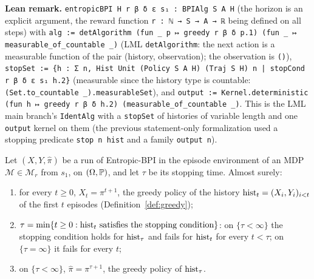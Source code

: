 \textbf{Lean remark.} \texttt{entropicBPI H r β δ ε s₁ : BPIAlg S A H} (the horizon is an
explicit argument, the reward function \texttt{r : ℕ → S → A → ℝ} being defined on all steps) with
\texttt{alg := detAlgorithm (fun \_ p ↦ greedy r β δ p.1) (fun \_ ↦ measurable\_of\_countable \_)}
(LML \texttt{detAlgorithm}: the next action is a measurable function of the pair (history,
observation); the observation is \texttt{()}), \texttt{stopSet := \{h : Σ n, Hist Unit (Policy S A H) (Traj S H) n | stopCond r β δ ε s₁ h.2\}}
(measurable since the history type is countable: \texttt{(Set.to\_countable \_).measurableSet}),
and \texttt{output := Kernel.deterministic (fun h ↦ greedy r β δ h.2) (measurable\_of\_countable \_)}.
This is the LML main branch's \texttt{IdentAlg} with a \texttt{stopSet} of histories of
variable length and one \texttt{output} kernel on them (the previous statement-only
formalization used a stopping predicate \texttt{stop n hist} and a family \texttt{output n}).

\begin{lemma}\label{lem:entropic_bpi_run}
\leanok
{}
Let $(X, Y, \hat\pi)$ be a run of Entropic-BPI in the episode environment of an MDP
$\mathcal M \in \mathcal M_r$ from $s_1$, on $(\Omega, \mathbb{P})$, and let $\tau$ be its stopping time.
Almost surely:
\begin{enumerate}
  \item[(i)] for every $t \ge 0$, $X_t = \pi^{t+1}$, the greedy policy of the history $\mathrm{hist}_t = (X_i, Y_i)_{i < t}$
        of the first $t$ episodes (Definition~\ref{def:greedy});
  \item[(ii)] $\tau = \min\{t \ge 0 : \mathrm{hist}_t \text{ satisfies the stopping condition}\}$: on
        $\{\tau < \infty\}$ the stopping condition holds for $\mathrm{hist}_\tau$ and fails for $\mathrm{hist}_t$
        for every $t < \tau$; on $\{\tau = \infty\}$ it fails for every $t$;
  \item[(iii)] on $\{\tau < \infty\}$, $\hat\pi = \pi^{\tau + 1}$, the greedy policy of $\mathrm{hist}_\tau$.
\end{enumerate}
\end{lemma}

